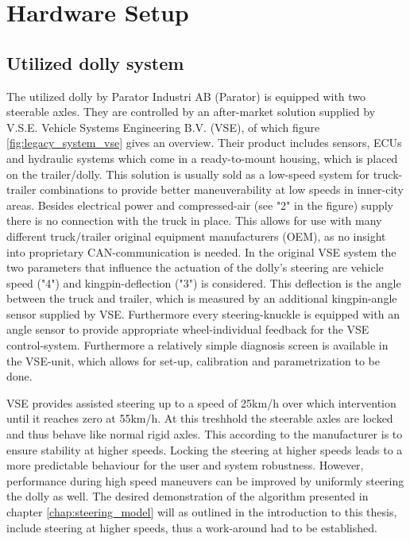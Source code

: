 \documentclass[ExampleMasters.tex]{subfiles}
\begin{document}
\clearpage


\chapter{Hardware Setup}
\label{chap:hardware_setup}
\section{Utilized dolly system}
\label{sec:dolly_system}
The utilized dolly by Parator Industri AB (Parator) is equipped with two steerable axles. They are controlled by an after-market solution supplied by V.S.E. Vehicle Systems Engineering B.V. (VSE), of which figure \ref{fig:legacy_system_vse} gives an overview. Their product includes sensors, ECUs and hydraulic systems which come in a ready-to-mount housing, which is placed on the trailer/dolly. This solution is usually sold as a low-speed system for truck-trailer combinations to provide better maneuverability at low speeds in inner-city areas. Besides electrical power and compressed-air (see "2" in the figure) supply there is no connection with the truck in place. This allows for use with many different truck/trailer original equipment manufacturers (OEM), as no insight into proprietary CAN-communication is needed. In the original VSE system the two parameters that influence the actuation of the dolly's steering are vehicle speed ("4") and kingpin-deflection ("3") is considered. This deflection is the angle between the truck and trailer, which is measured by an additional kingpin-angle sensor supplied by VSE. Furthermore every steering-knuckle is equipped with an angle sensor to provide appropriate wheel-individual feedback for the VSE control-system. Furthermore a relatively simple diagnosis screen is available in the VSE-unit, which allows for set-up, calibration and parametrization to be done.\cite{dolly_datasheet}

VSE provides assisted steering up to a speed of 25km/h over which intervention until it reaches zero at 55km/h. At this treshhold the steerable axles are locked and thus behave like normal rigid axles. This according to the manufacturer is to ensure stability at higher speeds.\cite{dolly_datasheet} Locking the steering at higher speeds leads to a more predictable behaviour for the user and system robustness. However, performance during high speed maneuvers can be improved by uniformly steering the dolly as well.\cite{performance_improvement} The desired demonstration of the algorithm presented in chapter \ref{chap:steering_model} will as outlined in the introduction to this thesis, include steering at higher speeds, thus a work-around had to be established.
\end{document}
